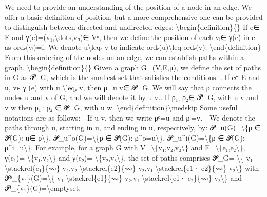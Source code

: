 \documentclass{article}%
\begin{document}
\newline%
We need to provide an understanding of the position of a node in an edge. We offer a basic definition of position, but a more comprehensive one can be provided to distinguish between directed and undirected edges:\newline%
\newline%
\textbackslash{}begin\{definition\}\{\}\newline%
If e∈ E and γ(e)=(v₁,\textbackslash{}dots,vₙ)∈ Vⁿ, then we define the position of each vᵢ∈ γ(e) in e as ordₑ(vᵢ)=i. We denote u\textbackslash{}leqₑ v to indicate ordₑ(u)\textbackslash{}leq ordₑ(v).\newline%
\textbackslash{}end\{definition\}\newline%
\newline%
From this ordering of the nodes on an edge, we can establish paths within a graph.\newline%
\newline%
\textbackslash{}begin\{definition\}\{\}\newline%
Given a graph G=(V,E,μ), we define the set of paths in G as 𝓟\_G, which is the smallest set that satisfies the conditions:\newline%
. If e∈ E and u, v∈ γ (e) with u \textbackslash{}leqₑ v, then ρ=u v∈ 𝓟\_G. We will say that ρ connects the nodes u and v of G, and we will denote it by u v.. If ρ₁, ρ₂∈ 𝓟\_G, with u v and v w then ρ₁·ρ₂ ∈ 𝓟\_G, with u w.\newline%
\textbackslash{}end\{definition\}\textbackslash{}medskip\newline%
\newline%
Some useful notations are as follows:\newline%
\newline%
{-} If u v, then we write ρᵒ=u and ρⁱ=v.\newline%
{-} We denote the paths through u, starting in u, and ending in u, respectively, by:\newline%
𝓟\_u(G)=\textbackslash{}\{ρ ∈ 𝓟(G): u∈ ρ\textbackslash{}\},\newline%
𝓟\_u\^{}o(G)=\textbackslash{}\{ρ ∈ 𝓟(G): ρ\^{}o=u\textbackslash{}\},\newline%
𝓟\_u\^{}i(G)=\textbackslash{}\{ρ ∈ 𝓟(G): ρ\^{}i=u\textbackslash{}\}.\newline%
For example, for a graph G with V=\textbackslash{}\{v₁,v₂,v₃\textbackslash{}\} and E=\textbackslash{}\{e₁,e₂\textbackslash{}\}, γ(e₁)= \textbackslash{}\{v₁,v₂\textbackslash{}\} and γ(e₂)= \textbackslash{}\{v₂,v₃\textbackslash{}\}, the set of paths comprises 𝓟\_G= \textbackslash{}\{ v₁ \textbackslash{}stackrel\{e₁\}\{⇝\} v₂,v₂ \textbackslash{}stackrel\{e2\}\{⇝\} v₃,v₁ \textbackslash{}stackrel\{e1· e2\}\{⇝\} v₃\textbackslash{}\} with 𝓟ᵒ\_\{v₁\}(G)=\textbackslash{}\{ v₁ \textbackslash{}stackrel\{e1\}\{⇝\} v₂,v₁ \textbackslash{}stackrel\{e1· e₂\}\{⇝\} v₃\textbackslash{}\} and 𝓟ⁱ\_\{v₁\}(G)=\textbackslash{}emptyset.\newline%
\end{document}
